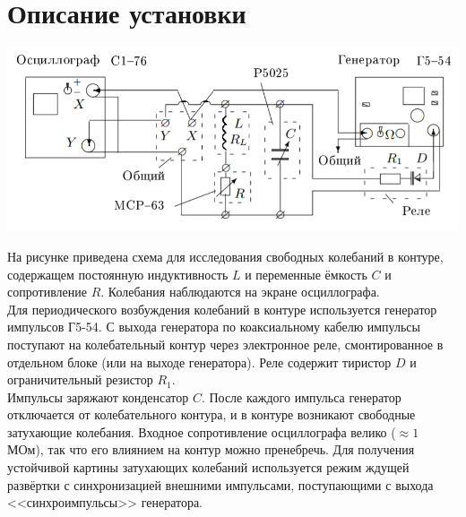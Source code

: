 \documentclass[a4paper,12pt]{article}
\begin{document}
\section*{Описание установки}
\begin{center}
\includegraphics[scale=0.6]{1.png}
\end{center}
На рисунке приведена схема для исследования свободных колебаний в контуре, содержащем постоянную индуктивность $L$ и переменные ёмкость $C$ и сопротивление $R$. Колебания наблюдаются на экране осциллографа.\\
Для периодического возбуждения колебаний в контуре используется генератор импульсов Г5-54. С выхода генератора по коаксиальному кабелю импульсы поступают на колебательный контур через электронное реле, смонтированное в отдельном блоке (или на выходе генератора). Реле содержит тиристор $D$ и ограничительный резистор $R_1$.\\
Импульсы заряжают конденсатор $C$. После каждого импульса генератор отключается от колебательного контура, и в контуре возникают свободные затухающие колебания. Входное сопротивление осциллографа велико ($\approx 1$ МОм), так что его влиянием на контур можно пренебречь. Для получения устойчивой картины затухающих колебаний используется режим ждущей развёртки с синхронизацией внешними импульсами, поступающими с выхода <<синхроимпульсы>> генератора.
\end{document}
